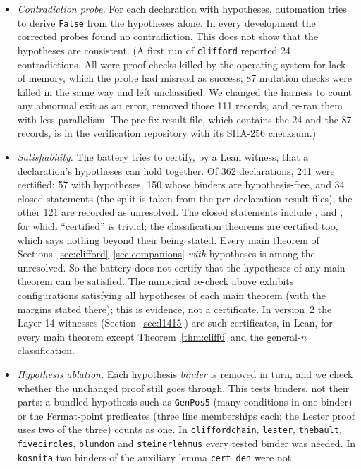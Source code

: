 \documentclass[11pt]{article}
\theoremstyle{definition}
\theoremstyle{remark}
\newcommand{\lean}[1]{\texttt{#1}}
\begin{document}
\begin{itemize}
\item \emph{Contradiction probe.} For each declaration with hypotheses, automation tries to derive
\lean{False} from the hypotheses alone. In every development the corrected probes found no
contradiction. This does not show that the hypotheses are consistent. (A first run of
\lean{clifford} reported 24 contradictions. All were proof checks killed by the operating system for
lack of memory, which the probe had misread as success; 87 mutation checks were killed in the same way
and left unclassified. We changed the harness to count any abnormal exit as an error, removed those
111 records, and re-ran them with less parallelism. The pre-fix result file, which contains the 24 and
the 87 records, is in the verification repository with its SHA-256 checksum.)
\item \emph{Satisfiability.} The battery tries to certify, by a Lean witness, that a declaration's
hypotheses can hold together. Of 362 declarations, 241 were certified: 57 with hypotheses, 150 whose
binders are hypothesis-free, and 34 closed statements (the split is taken from the per-declaration
result files); the other 121 are recorded as unresolved. The closed statements include
,  and
, for which ``certified'' is trivial; the classification
theorems are certified too, which says nothing beyond their being stated. Every main theorem of
Sections~\ref{sec:clifford}--\ref{sec:companions} \emph{with} hypotheses is among the unresolved. So the battery does not
certify that the hypotheses of any main theorem can be satisfied. The numerical re-check above exhibits configurations satisfying all hypotheses of
each main theorem (with the margins stated there); this is evidence, not a certificate. In version~2
the Layer-14 witnesses (Section~\ref{sec:l1415}) are such certificates, in Lean, for every main
theorem except Theorem~\ref{thm:cliff6} and the general-$n$ classification.
\item \emph{Hypothesis ablation.} Each hypothesis \emph{binder} is removed in turn, and we check whether
the unchanged proof still goes through. This tests binders, not their parts: a bundled hypothesis such
as \lean{GenPos5} (many conditions in one binder) or the Fermat-point predicates (three line
memberships each; the Lester proof uses two of the three) counts as one. In \lean{cliffordchain},
\lean{lester}, \lean{thebault}, \lean{fivecircles}, \lean{blundon} and \lean{steinerlehmus} every tested
binder was needed. In \lean{kosnita} two binders of the auxiliary lemma \lean{cert\_den} were not

\end{itemize}
\end{document}
